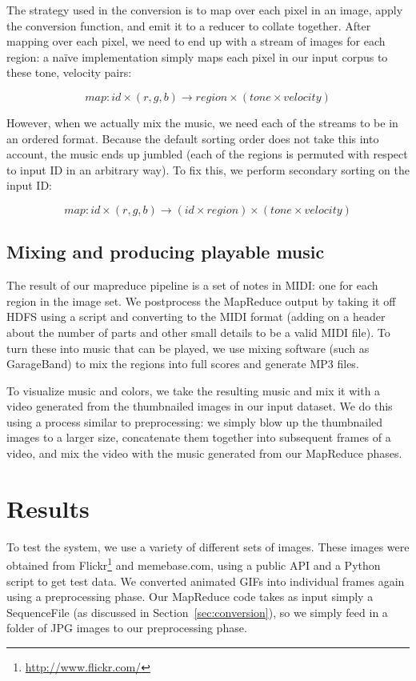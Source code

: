 \documentclass[10pt, conference, compsocconf]{IEEEtran}
\newcommand{\code}[1]{\textsf{\small #1}}
\begin{document}
The strategy used in the conversion is to map over each pixel in an
image, apply the conversion function, and emit it to a reducer to
collate together.  After mapping over each pixel, we need to end up
with a stream of images for each region: a na\"{i}ve implementation simply
maps each pixel in our input corpus to these tone, velocity pairs:

\[
  map : id \times (r,g,b) \to region \times (tone \times velocity)
\]

However, when we actually mix the music, we need each of the streams
to be in an ordered format.  Because the default sorting order does
not take this into account, the music ends up jumbled (each of the
regions is permuted with respect to input ID in an arbitrary way).  To
fix this, we perform secondary sorting on the input ID:

\[
  map : id \times (r,g,b) \to (id \times region) \times (tone \times velocity)
\]

\subsection{Mixing and producing playable music}

The result of our mapreduce pipeline is a set of notes in MIDI: one
for each region in the image set.  We postprocess the MapReduce output
by taking it off HDFS using a script and converting to the MIDI format
(adding on a header about the number of parts and other small details
to be a valid MIDI file). To turn these into music that can be played,
we use mixing software (such as GarageBand) to mix the regions into
full scores and generate MP3 files.

To visualize music and colors, we take the resulting music and mix it
with a video generated from the thumbnailed images in our input
dataset.  We do this using a process similar to preprocessing: we
simply blow up the thumbnailed images to a larger size, concatenate
them together into subsequent frames of a video, and mix the video
with the music generated from our MapReduce phases.

\section{Results}

To test the system, we use a variety of different sets of images.
These images were obtained from
Flickr\footnote{\url{http://www.flickr.com/}} and \code{memebase.com},
using a public API and a Python script \cite{flickrpy} to get test
data.  We converted animated GIFs into individual frames again using a
preprocessing phase.  Our MapReduce code takes as input simply a
\code{SequenceFile} (as discussed in Section~\ref{sec:conversion}), so
we simply feed in a folder of JPG images to our preprocessing phase.
\end{document}
